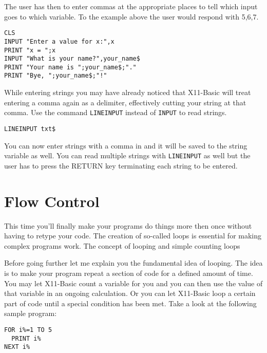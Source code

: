 The user has then to enter commas at the appropriate places to tell which
input goes to which variable. To the example above the user would respond with
5,6,7. 

\begin{mdframed}[hidealllines=true,backgroundcolor=blue!20]
\begin{verbatim}
CLS
INPUT "Enter a value for x:",x
PRINT "x = ";x
INPUT "What is your name?",your_name$
PRINT "Your name is ";your_name$;"."
PRINT "Bye, ";your_name$;"!" 
\end{verbatim}
\end{mdframed}

While entering strings you may have already noticed that X11-Basic will treat
entering a comma again as a delimiter, effectively cutting your string at that
comma. Use the command \verb|LINEINPUT| instead of \verb|INPUT| to read strings.

\begin{mdframed}[hidealllines=true,backgroundcolor=blue!20]
\begin{verbatim}
LINEINPUT txt$
\end{verbatim}
\end{mdframed}

You can now enter strings with a comma in and it will be saved to the string
variable as well. You can read multiple strings with \verb|LINEINPUT| as well but the
user has to press the RETURN key terminating each string to be entered.

\section{Flow Control}

This time you'll finally make your programs do things more then once without
having to retype your code. The creation of so-called loops is essential for
making complex programs work. The concept of looping and simple counting loops

Before going further let me explain you the fundamental idea of looping. The
idea is to make your program repeat a section of code for a defined amount of
time. You may let X11-Basic count a variable for you and you can then use the
value of that variable in an ongoing calculation. Or you can let X11-Basic loop
a certain part of code until a special condition has been met. Take a look at
the following sample program:

\begin{mdframed}[hidealllines=true,backgroundcolor=blue!20]
\begin{verbatim}
FOR i%=1 TO 5
  PRINT i%
NEXT i%
\end{verbatim}
\end{mdframed}


